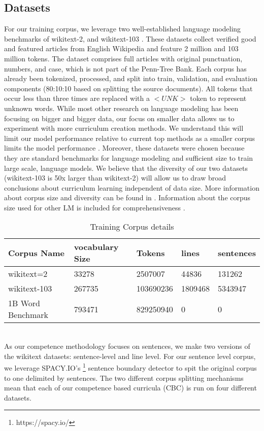 \subsection{Datasets}
For our training corpus, we leverage two well-established language modeling benchmarks of wikitext-2, and wikitext-103 \cite{Merity2016PointerSM}. These datasets collect verified good and featured articles from English Wikipedia and feature 2 million and 103 million tokens. The dataset comprises full articles with original punctuation, numbers, and case, which is not part of the Penn-Tree Bank. Each corpus has already been tokenized, processed, and split into train, validation, and evaluation components (80:10:10 based on splitting the source documents). All tokens that occur less than three times are replaced with a $<UNK>$ token to represent unknown words. While most other research on language modeling has been focusing on bigger and bigger data, our focus on smaller data allows us to experiment with more curriculum creation methods. We understand this will limit our model performance relative to current top methods as a smaller corpus limits the model performance \cite{Kaplan2020ScalingLF}. Moreover, these datasets were chosen because they are standard benchmarks for language modeling and sufficient size to train large scale, language models. We believe that the diversity of our two datasets (wikitext-103 is 50x larger than wikitext-2) will allow us to draw broad conclusions about curriculum learning independent of data size. More information about corpus size and diversity can be found in . Information about the corpus size used for other LM is included for comprehensiveness \cite{Chelba2014OneBW}.\\
\begin{table}[h!]
\begin{tabular}{|l|l|l|l|l|} \hline
\textbf{Corpus Name} & \textbf{vocabulary Size} & \textbf{Tokens} & \textbf{lines} & \textbf{sentences} \\ \hline
wikitext=2 & 33278 & 2507007 & 44836 & 131262 \\ \hline
wikitext-103 & 267735 & 103690236 & 1809468  & 5343947 \\ \hline
1B Word Benchmark & 793471 & 829250940 & 0 & 0 \\ \hline
\end{tabular}
\caption{Training Corpus details}
\label{table:corpussize}
\end{table} \\
As our competence methodology focuses on sentences, we make two versions of the wikitext datasets: sentence-level and line level. For our sentence level corpus, we leverage SPACY.IO's \cite{spacy2} \footnote{https://spacy.io/} sentence boundary detector to spit the original corpus to one delimited by sentences. The two different corpus splitting mechanisms mean that each of our competence based curricula (CBC) is run on four different datasets.

